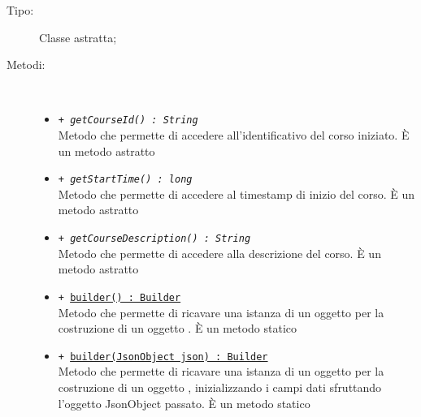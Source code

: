 \documentclass[../Tesi.tex]{subfiles}
\begin{document}
		\begin{description}
			\item[Tipo:] Classe astratta;
			
			\item[Metodi:] \
			\begin{itemize}
				\item \texttt{+ \textit{getCourseId() : String}}\\
				Metodo che permette di accedere all'identificativo del corso iniziato. È un metodo astratto

				\item \texttt{+ \textit{getStartTime() : long}}\\
				Metodo che permette di accedere al timestamp di inizio del corso. È un metodo astratto

				\item \texttt{+ \textit{getCourseDescription() : String}}\\
				Metodo che permette di accedere alla descrizione del corso. È un metodo astratto

				\item \texttt{+ \underline{builder() : Builder}}\\
				Metodo che permette di ricavare una istanza di un oggetto  per la costruzione di un oggetto . È un metodo statico

				\item \texttt{+ \underline{builder(JsonObject json) : Builder}}\\
				Metodo che permette di ricavare una istanza di un oggetto  per la costruzione di un oggetto , inizializzando i campi dati sfruttando l'oggetto JsonObject passato. È un metodo statico

			\end{itemize}
		\end{description}
\end{document}
